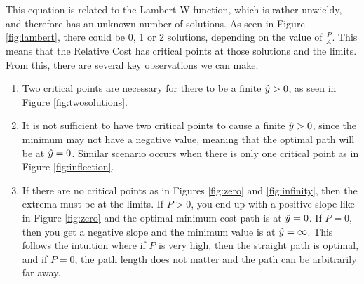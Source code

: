 This equation is related to the Lambert W-function, which is rather unwieldy, and therefore has an unknown number of solutions. As seen in Figure \ref{fig:lambert}, there could be 0, 1 or 2 solutions, depending on the value of $\frac{P}{A}$. This means that the Relative Cost has critical points at those solutions and the limits. From this, there are several key observations we can make. 
\begin{enumerate}
\item Two critical points are necessary for there to be a finite $\hat{y}>0$, as seen in Figure \ref{fig:twosolutions}. 
\item It is not sufficient to have two critical points to cause a finite $\hat{y}>0$, since the minimum may not have a negative value, meaning that the optimal path will be at $\hat{y}=0$. Similar scenario occurs when there is only one critical point as in Figure \ref{fig:inflection}. 
\item If there are no critical points as in Figures \ref{fig:zero} and \ref{fig:infinity}, then the extrema must be at the limits. If $P>0$, you end up with a positive slope like in Figure \ref{fig:zero} and the optimal minimum cost path is at $\hat{y}=0$. If $P=0$, then you get a negative slope and the minimum value is at $\hat{y}=\infty$. This follows the intuition where if $P$ is very high, then the straight path is optimal, and if $P=0$, the path length does not matter and the path can be arbitrarily far away. 
\end{enumerate}

